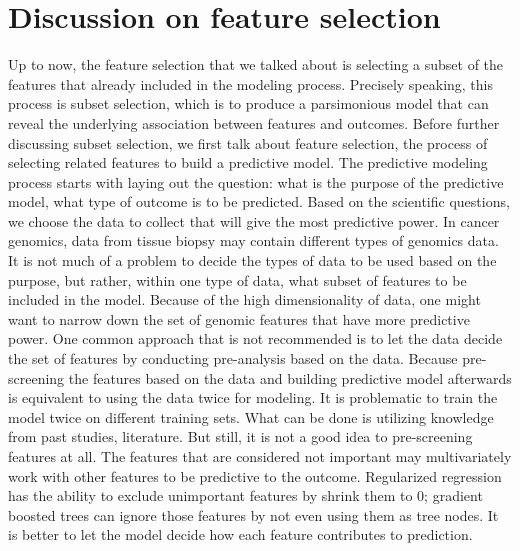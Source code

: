 \section {Discussion on feature selection}
Up to now, the feature selection that we talked about is selecting a subset of the features that already included in the modeling process. Precisely speaking, this process is subset selection, which is to produce a parsimonious model that can reveal the underlying association between features and outcomes. Before further discussing subset selection, we first talk about feature selection, the process of selecting related features to build a predictive model. The predictive modeling process starts with laying out the question: what is the purpose of the predictive model, what type of outcome is to be predicted. Based on the scientific questions, we choose the data to collect that will give the most predictive power. In cancer genomics, data from tissue biopsy may contain different types of genomics data. It is not much of a problem to decide the types of data to be used based on the purpose, but rather, within one type of data, what subset of features to be included in the model. Because of the high dimensionality of data, one might want to narrow down the set of genomic features that have more predictive power. One common approach that is not recommended is to let the data decide the set of features by conducting pre-analysis based on the data. Because pre-screening the features based on the data and building predictive model afterwards is equivalent to using the data twice for modeling. It is problematic to train the model twice on different training sets. What can be done is utilizing knowledge from past studies, literature. But still, it is not a good idea to pre-screening features at all. The features that are considered not important may multivariately work with other features to be predictive to the outcome. Regularized regression has the ability to exclude unimportant features by shrink them to 0; gradient boosted trees can ignore those features by not even using them as tree nodes. It is better to let the model decide how each feature contributes to prediction.

